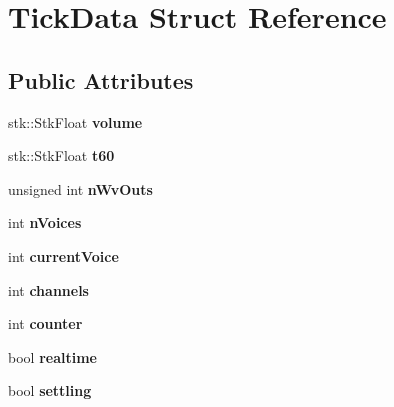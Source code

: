 \hypertarget{structTickData}{\section{Tick\-Data Struct Reference}
\label{structTickData}
}
\subsection*{Public Attributes}
\begin{DoxyCompactItemize}
\item 
\hypertarget{structTickData_a81bc42e25163a7afb9725153fac3d713}{stk\-::\-Stk\-Float {\bfseries volume}}\label{structTickData_a81bc42e25163a7afb9725153fac3d713}

\item 
\hypertarget{structTickData_a9916301f9f675256327e1ac0bdb8f9f4}{stk\-::\-Stk\-Float {\bfseries t60}}\label{structTickData_a9916301f9f675256327e1ac0bdb8f9f4}

\item 
\hypertarget{structTickData_abda86f5671f18f3e09fa6e0877c70bca}{unsigned int {\bfseries n\-Wv\-Outs}}\label{structTickData_abda86f5671f18f3e09fa6e0877c70bca}

\item 
\hypertarget{structTickData_ac53a7ecd6dfff24019bfb607202f6024}{int {\bfseries n\-Voices}}\label{structTickData_ac53a7ecd6dfff24019bfb607202f6024}

\item 
\hypertarget{structTickData_a620ca81cff77e4cdaf0025b73bc37e61}{int {\bfseries current\-Voice}}\label{structTickData_a620ca81cff77e4cdaf0025b73bc37e61}

\item 
\hypertarget{structTickData_ad147869433dc1b3526aa9f4dbb3b4cc5}{int {\bfseries channels}}\label{structTickData_ad147869433dc1b3526aa9f4dbb3b4cc5}

\item 
\hypertarget{structTickData_a54ba17f6bb83ce8efe0758614221f026}{int {\bfseries counter}}\label{structTickData_a54ba17f6bb83ce8efe0758614221f026}

\item 
\hypertarget{structTickData_aa60016ecb88b0bdae8395aa7517a6f1f}{bool {\bfseries realtime}}\label{structTickData_aa60016ecb88b0bdae8395aa7517a6f1f}

\item 
\hypertarget{structTickData_a4682f375c65eb79d9166933ec9c79c2b}{bool {\bfseries settling}}\label{structTickData_a4682f375c65eb79d9166933ec9c79c2b}


\end{DoxyCompactItemize}
